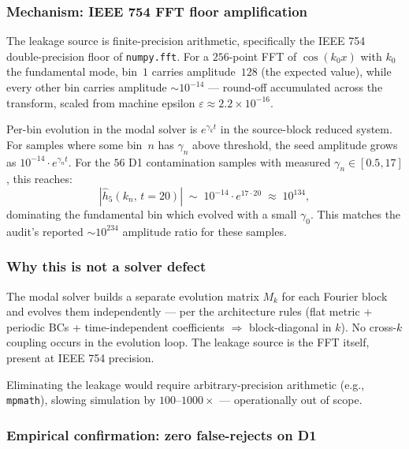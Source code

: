 \subsubsection{Mechanism: IEEE 754 FFT floor amplification}
\label{sec:ieee-floor}

The leakage source is finite-precision arithmetic, specifically the
IEEE 754 double-precision floor of \texttt{numpy.fft}. For a
$256$-point FFT of $\cos(k_0 x)$ with $k_0$ the fundamental mode,
bin~$1$ carries amplitude~$128$ (the expected value), while every
other bin carries amplitude $\sim 10^{-14}$ --- round-off accumulated
across the transform, scaled from machine epsilon
$\varepsilon \approx 2.2\times 10^{-16}$.

Per-bin evolution in the modal solver is $e^{\gamma_k t}$ in the
source-block reduced system. For samples where some bin~$n$ has
$\gamma_n$ above threshold, the seed amplitude grows as
$10^{-14}\cdot e^{\gamma_n t}$. For the $56$ D1 contamination samples
with measured $\gamma_n \in [0.5, 17]$, this reaches:
\begin{equation*}
  |\hat{h}_5(k_n,\, t=20)|
  \;\sim\; 10^{-14}\cdot e^{17 \cdot 20}
  \;\approx\; 10^{134},
\end{equation*}
dominating the fundamental bin which evolved with a small $\gamma_0$.
This matches the audit's reported $\sim 10^{234}$ amplitude ratio for
these samples.

\subsubsection{Why this is not a solver defect}

The modal solver builds a separate evolution matrix $M_k$ for each
Fourier block and evolves them independently --- per the architecture
rules (flat metric + periodic BCs + time-independent coefficients
$\Rightarrow$ block-diagonal in $k$). No cross-$k$ coupling occurs in
the evolution loop. The leakage source is the FFT itself, present at
IEEE 754 precision.

Eliminating the leakage would require arbitrary-precision arithmetic
(e.g., \texttt{mpmath}), slowing simulation by $100$--$1000\times$ ---
operationally out of scope.

\subsubsection{Empirical confirmation: zero false-rejects on D1}

